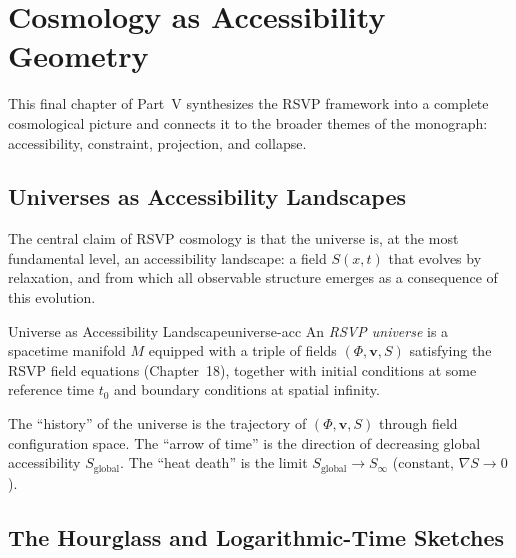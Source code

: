 \chapter{Cosmology as Accessibility Geometry}



This final chapter of Part~V synthesizes the RSVP framework into a
complete cosmological picture and connects it to the broader themes
of the monograph: accessibility, constraint, projection, and collapse.

\section{Universes as Accessibility Landscapes}

The central claim of RSVP cosmology is that the universe is, at the
most fundamental level, an accessibility landscape: a field $S(x,t)$
that evolves by relaxation, and from which all observable structure
emerges as a consequence of this evolution.

\begin{definition}{Universe as Accessibility Landscape}{universe-acc}
  An \emph{RSVP universe} is a spacetime manifold $M$ equipped with a
  triple of fields $(\Phi, \mathbf{v}, S)$ satisfying the RSVP field
  equations (Chapter~18), together with initial conditions at some
  reference time $t_0$ and boundary conditions at spatial infinity.
\end{definition}

The ``history'' of the universe is the trajectory of $(\Phi, \mathbf{v}, S)$
through field configuration space. The ``arrow of time'' is the direction
of decreasing global accessibility $S_\text{global}$. The ``heat death''
is the limit $S_\text{global} \to S_\infty$ (constant, $\nabla S \to 0$).

\section{The Hourglass and Logarithmic-Time Sketches}

